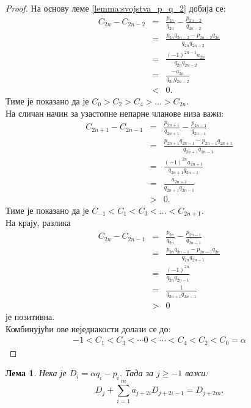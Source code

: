\documentclass[a4paper]{article}
\newtheorem{lemma}{Лема}
\begin{document}
\begin{proof}
	На основу леме \ref{lemma:svojstva_p_q_2} добија се:
	\begin{eqnarray*}
		C_{2n} - C_{2n-2} &=& \frac{p_{2n}}{q_{2n}} - \frac{p_{2n-2}}{q_{2n-2}}\\
						  &=& \frac{p_{2n}q_{2n-2} - p_{2n-2}q_{2n}}{q_{2n}q_{2n-2}}\\
						  &=& \frac{(-1)^{2n-1}a_{2n}}{q_{2n}q_{2n-2}}\\
						  &=& \frac{-a_{2n}}{q_{2n}q_{2n-2}}\\
						  &<& 0.
	\end{eqnarray*}
	Тиме је показано да је $ C_{0} > C_{2} > C_{4} > \ldots > C_{2n} $.\\
	На сличан начин за узастопне непарне чланове низа важи:
	\begin{eqnarray*}
		C_{2n+1} - C_{2n-1} &=& \frac{p_{2n+1}}{q_{2n+1}} - \frac{p_{2n-1}}{q_{2n-1}}\\
		&=& \frac{p_{2n+1}q_{2n-1} - p_{2n-1}q_{2n+1}}{q_{2n+1}q_{2n-1}}\\
		&=& \frac{(-1)^{2n}a_{2n+1}}{q_{2n+1}q_{2n-1}}\\
		&=& \frac{a_{2n+1}}{q_{2n+1}q_{2n-1}}\\
		&>& 0.
	\end{eqnarray*}
	Тиме је показано да је $ C_{-1} < C_{1} < C_{3} < \ldots < C_{2n+1} $.\\
	На крају, разлика
	\begin{eqnarray*}
		C_{2n} - C_{2n-1} &=& \frac{p_{2n}}{q_{2n}} - \frac{p_{2n-1}}{q_{2n-1}}\\
		&=& \frac{p_{2n}q_{2n-1} - p_{2n-1}q_{2n}}{q_{2n}q_{2n-1}}\\
		&=& \frac{(-1)^{2n}}{q_{2n}q_{2n-1}}\\
		&=& \frac{1}{q_{2n+1}q_{2n-1}}\\
		&>& 0
	\end{eqnarray*}
	је позитивна.\\
	Комбинујући ове неједнакости долази се до:
	\begin{eqnarray*}
		-1 < C_{1} < C_{3} < \cdots 0 < \cdots < C_{4} < C_{2} < C_{0} = \alpha
	\end{eqnarray*}	
\end{proof}

\begin{lemma}
	\label{lemma:svojstva_konvergenata_2}
	Нека је $ D_{i} = \alpha q_{i} - p_{i} $. Тада за $ j \ge -1 $ важи:
	\begin{displaymath}
		D_{j} + \sum_{i=1}^{m} a_{j+2i}D_{j+2i-1} = D_{j+2m}.
	\end{displaymath}
\end{lemma}
\end{document}
